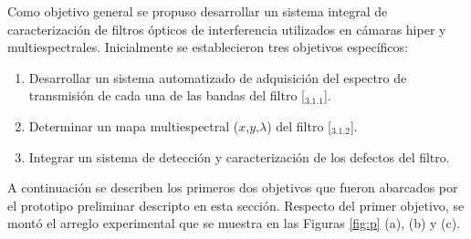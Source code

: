 Como objetivo general se propuso desarrollar un sistema integral de caracterización de filtros ópticos de interferencia utilizados en cámaras hiper y multiespectrales. Inicialmente se establecieron tres objetivos específicos:
\begin{enumerate}
\item Desarrollar un sistema automatizado de adquisición del espectro de transmisión de cada una de las bandas del filtro [\href{https://github.com/jrr1984/Prototipo0\_S-D\_SpectralGUI/blob/master/barrido/std}{\faGithub$_{3.1.1}$}].

\item Determinar un mapa multiespectral ($\textit{x}$,$\textit{y}$,$\lambda$) del filtro [\href{https://github.com/jrr1984/Prototipo0\_S-D\_SpectralGUI/blob/master/spectral\_gui/main.py}{\faGithub$_{3.1.2}$}].

\item Integrar un sistema de detección y caracterización de los defectos del filtro.
\end{enumerate}

A continuación se describen los primeros dos objetivos que fueron abarcados por el prototipo preliminar descripto en esta sección. Respecto del primer objetivo, se montó el arreglo experimental que se muestra en las Figuras \ref{fig:p} (a), (b) y (c). 

